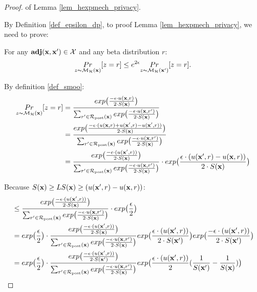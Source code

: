 \documentclass{article}
\begin{document}
\begin{proof} of Lemma \ref{lem_hexpmech_privacy}.

  By Definition \ref{def_epsilon_dp}, to proof Lemma \ref{lem_hexpmech_privacy}, we need to prove:

  For any $\adj{\dataobs}{\dataobs'} \in \mathcal{X}$ and any beta distribution $r$:
  \begin{equation*}
  \hexpmechPr{\dataobs}{z = r} \leq e^{2\epsilon} \hexpmechPr{\dataobs'}{z = r}. 
  \end{equation*}

  By definition \ref{def_smoo}:
  \begin{equation*}
  \begin{split}
  \hexpmechPr{\dataobs}{z = r} 
  & = \frac {exp\big(\frac{-\epsilon\cdot\ux{r}}{2\cdot S(\dataobs)}\big)}{\unomalizer{\dataobs}} \\
  & = \frac {exp\big(
  \frac{-\epsilon\cdot(\ux{r} + \uxadj{r} - \uxadj{r})}{2\cdot S(\dataobs)}
  \big)}
  {\unomalizer{\dataobs}} \\
  & = \frac {exp\big(
  \frac{-\epsilon\cdot(\uxadj{r})}{2\cdot S(\dataobs)}
  \big)}
  {\unomalizer{\dataobs}}
  \cdot exp\big( \frac{\epsilon\cdot(\uxadj{r} - \ux{r})}{2\cdot S(\dataobs)} \big)\\
  \end{split}
  \end{equation*}

  Because $S(\dataobs) \geq LS(\dataobs) \geq (\uxadj{r} - \ux{r})$:
  \begin{equation*}
  \begin{split}
  & \leq \frac {exp\big(
  \frac{-\epsilon\cdot(\uxadj{r})}{2\cdot S(\dataobs)}
  \big)}
  {\unomalizer{\dataobs}}
  \cdot exp\big( \frac{\epsilon}{2} \big) \\
  & = exp\big( \frac{\epsilon}{2} \big) \cdot 
  \frac {
  exp
  \big(
  \frac{-\epsilon\cdot(\uxadj{r})}{2\cdot S(\dataobs)}
  \big)
  } 
  {\unomalizer{\dataobs}}
  exp
  \big(
  \frac{\epsilon\cdot(\uxadj{r})}{2\cdot S(\dataobs')}
  \big)
  exp
  \big(
  \frac{-\epsilon\cdot(\uxadj{r})}{2\cdot S(\dataobs')}
  \big)\\
  & = exp\big( \frac{\epsilon}{2} \big) \cdot 
  \frac {
  exp
  \big(
  \frac{-\epsilon\cdot(\uxadj{r})}{2\cdot S(\dataobs')}
  \big)
  } 
  {\unomalizer{\dataobs}}
  exp
  \big(
  \frac{\epsilon\cdot(\uxadj{r})}{2}(\frac{1}{S(\dataobs')} - \frac{1}{S(\dataobs)})
  \big)\\
  \end{split}
  \end{equation*}
  

\end{proof}
\end{document}
